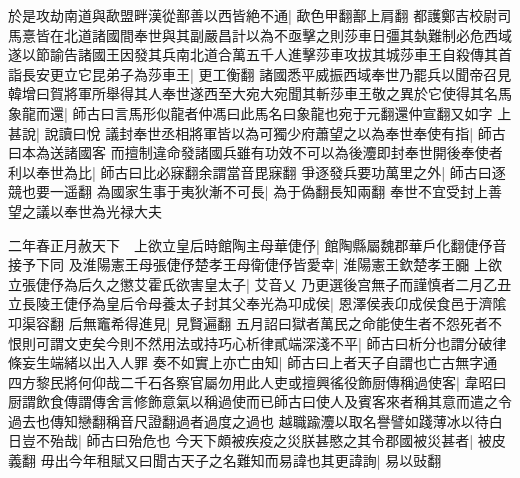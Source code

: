 於是攻劫南道與歃盟畔漢從鄯善以西皆絶不通|{
	歃色甲翻鄯上肩翻}
都護鄭吉校尉司馬憙皆在北道諸國間奉世與其副嚴昌計以為不亟擊之則莎車日彊其埶難制必危西域遂以節諭告諸國王因發其兵南北道合萬五千人進擊莎車攻拔其城莎車王自殺傳其首詣長安更立它昆弟子為莎車王|{
	更工衡翻}
諸國悉平威振西域奉世乃罷兵以聞帝召見韓增曰賀將軍所舉得其人奉世遂西至大宛大宛聞其斬莎車王敬之異於它使得其名馬象龍而還|{
	師古曰言馬形似龍者仲馮曰此馬名曰象龍也宛于元翻還仲宣翻又如字}
上甚說|{
	說讀曰悅}
議封奉世丞相將軍皆以為可獨少府蕭望之以為奉世奉使有指|{
	師古曰本為送諸國客}
而擅制違命發諸國兵雖有功效不可以為後灋即封奉世開後奉使者利以奉世為比|{
	師古曰比必寐翻余謂當音毘寐翻}
爭逐發兵要功萬里之外|{
	師古曰逐競也要一遥翻}
為國家生事于夷狄漸不可長|{
	為于偽翻長知兩翻}
奉世不宜受封上善望之議以奉世為光禄大夫

二年春正月赦天下　上欲立皇后時館陶主母華倢伃|{
	館陶縣屬魏郡華戶化翻倢伃音接予下同}
及淮陽憲王母張倢伃楚孝王母衛倢伃皆愛幸|{
	淮陽憲王欽楚孝王嚻}
上欲立張倢伃為后久之懲艾霍氏欲害皇太子|{
	艾音乂}
乃更選後宫無子而謹慎者二月乙丑立長陵王倢伃為皇后令母養太子封其父奉光為卭成侯|{
	恩澤侯表卬成侯食邑于濟隂卭渠容翻}
后無竈希得進見|{
	見賢遍翻}
五月詔曰獄者萬民之命能使生者不怨死者不恨則可謂文吏矣今則不然用法或持巧心析律貳端深淺不平|{
	師古曰析分也謂分破律條妄生端緒以出入人罪}
奏不如實上亦亡由知|{
	師古曰上者天子自謂也亡古無字通}
四方黎民將何仰哉二千石各察官屬勿用此人吏或擅興徭役飾厨傳稱過使客|{
	韋昭曰厨謂飲食傳謂傳舍言修飾意氣以稱過使而已師古曰使人及賓客來者稱其意而遣之令過去也傳知戀翻稱音尺證翻過者過度之過也}
越職踰灋以取名譽譬如踐薄冰以待白日豈不殆哉|{
	師古曰殆危也}
今天下頗被疾疫之災朕甚愍之其令郡國被災甚者|{
	被皮義翻}
毋出今年租賦又曰聞古天子之名難知而易諱也其更諱詢|{
	易以䜴翻}


